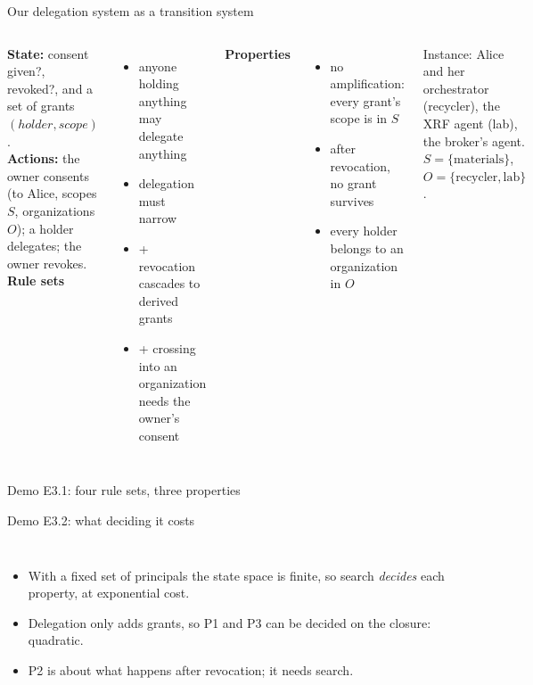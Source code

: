 \documentclass[aspectratio=169, 10pt]{beamer}
\begin{document}
\begin{frame}{Our delegation system as a transition system}
  \begin{columns}[T]
    \small
    \textbf{State:} consent given?, revoked?, and a set of grants $(\mathit{holder}, \mathit{scope})$.\\[2pt]
    \textbf{Actions:} the owner consents (to Alice, scopes $S$, organizations $O$); a holder delegates; the owner revokes.\\[4pt]
    \textbf{Rule sets}
    \begin{itemize}\scriptsize
      \item[R0] anyone holding anything may delegate anything
      \item[R1] delegation must narrow
      \item[R2] + revocation cascades to derived grants
      \item[R3] + crossing into an organization needs the owner's consent
    \end{itemize}
    \small\textbf{Properties}
    \begin{itemize}\scriptsize
      \item[P1] no amplification: every grant's scope is in $S$
      \item[P2] after revocation, no grant survives
      \item[P3] every holder belongs to an organization in $O$
    \end{itemize}
    \vspace{2mm}
    \small Instance: Alice and her orchestrator (recycler), the XRF agent (lab), the broker's agent. $S = \{\text{materials}\}$, $O = \{\text{recycler}, \text{lab}\}$.
  \end{columns}
\end{frame}

\begin{frame}{Demo E3.1: four rule sets, three properties}
  \centering{}\par
  \vspace{3mm}
\end{frame}

\begin{frame}{Demo E3.2: what deciding it costs}
  \begin{columns}[c]
    \small
    \begin{itemize}
      \item With a fixed set of principals the state space is finite, so search \emph{decides} each property, at exponential cost.
      \item Delegation only adds grants, so P1 and P3 can be decided on the closure: quadratic.
      \item P2 is about what happens after revocation; it needs search.
    \end{itemize}
  \end{columns}
\end{frame}
\end{document}
